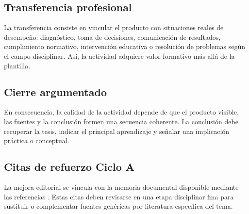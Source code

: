 \documentclass[12pt]{article}
\begin{document}
\subsection*{Transferencia profesional}
La transferencia consiste en vincular el producto con situaciones reales de desempeño: diagnóstico, toma de decisiones, comunicación de resultados, cumplimiento normativo, intervención educativa o resolución de problemas según el campo disciplinar. Así, la actividad adquiere valor formativo más allá de la plantilla.

\subsection*{Cierre argumentado}
En consecuencia, la calidad de la actividad depende de que el producto visible, las fuentes y la conclusión formen una secuencia coherente. La conclusión debe recuperar la tesis, indicar el principal aprendizaje y señalar una implicación práctica o conceptual.



\subsection*{Citas de refuerzo Ciclo A}
La mejora editorial se vincula con la memoria documental disponible mediante las referencias \citep{cicloARefuerzo01,cicloARefuerzo02,cicloARefuerzo03,cicloARefuerzo04,cicloARefuerzo05,cicloARefuerzo06}. Estas citas deben revisarse en una etapa disciplinar fina para sustituir o complementar fuentes genéricas por literatura específica del tema.
\end{document}
